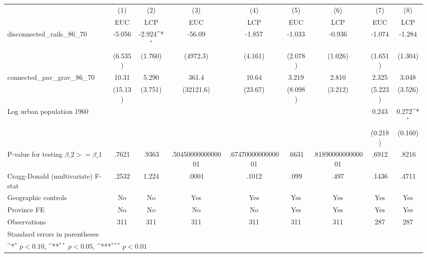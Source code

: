 {
\def\sym#1{\ifmmode^{#1}\else\(^{#1}\)\fi}
\begin{tabular}{l*{8}{c}}
\hline\hline
                &\multicolumn{1}{c}{(1)}&\multicolumn{1}{c}{(2)}&\multicolumn{1}{c}{(3)}&\multicolumn{1}{c}{(4)}&\multicolumn{1}{c}{(5)}&\multicolumn{1}{c}{(6)}&\multicolumn{1}{c}{(7)}&\multicolumn{1}{c}{(8)}\\
                &\multicolumn{1}{c}{EUC}&\multicolumn{1}{c}{LCP}&\multicolumn{1}{c}{EUC}&\multicolumn{1}{c}{LCP}&\multicolumn{1}{c}{EUC}&\multicolumn{1}{c}{LCP}&\multicolumn{1}{c}{EUC}&\multicolumn{1}{c}{LCP}\\
\hline
disconnected\_rails\_86\_70&   -5.056         &   -2.924\sym{*}  &   -56.09         &   -1.857         &   -1.033         &   -0.936         &   -1.074         &   -1.284         \\
                &  (6.535)         &  (1.760)         & (4972.3)         &  (4.161)         &  (2.078)         &  (1.026)         &  (1.651)         &  (1.304)         \\
[1em]
connected\_pav\_grav\_86\_70&    10.31         &    5.290         &    361.4         &    10.64         &    3.219         &    2.810         &    2.325         &    3.048         \\
                &  (15.13)         &  (3.751)         &(32121.6)         &  (23.67)         &  (8.098)         &  (3.212)         &  (5.223)         &  (3.526)         \\
[1em]
Log urban population 1960&                  &                  &                  &                  &                  &                  &    0.243         &    0.272\sym{*}  \\
                &                  &                  &                  &                  &                  &                  &  (0.218)         &  (0.160)         \\
\hline
P-value for testing $\beta\_{2} >= \beta\_{1}$&    .7621         &    .9363         &.5045000000000001         &.6747000000000001         &    .6631         &.8189000000000001         &    .6912         &    .8216         \\
Cragg-Donald (multivariate) F-stat&    .2532         &    1.224         &    .0001         &    .1012         &     .099         &     .497         &    .1436         &    .4711         \\
Geographic controls&       No         &       No         &      Yes         &      Yes         &      Yes         &      Yes         &      Yes         &      Yes         \\
Province FE     &       No         &       No         &       No         &       No         &      Yes         &      Yes         &      Yes         &      Yes         \\
Observations    &      311         &      311         &      311         &      311         &      311         &      311         &      287         &      287         \\
\hline\hline
\multicolumn{9}{l}{\footnotesize Standard errors in parentheses}\\
\multicolumn{9}{l}{\footnotesize \sym{*} \(p<0.10\), \sym{**} \(p<0.05\), \sym{***} \(p<0.01\)}\\
\end{tabular}
}
